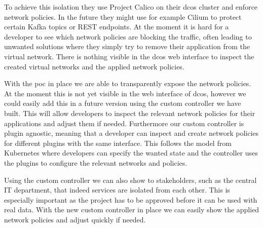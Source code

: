 To achieve this isolation they use Project Calico on their \gls{dcos} cluster and enforce network policies. In the future they might use for example Cilium to protect certain Kafka topics or REST endpoints. At the moment it is hard for a developer to see which network policies are blocking the traffic, often leading to unwanted solutions where they simply try to remove their application from the virtual network. There is nothing visible in the \gls{dcos} web interface to inspect the created virtual networks and the applied network policies.

With the \gls{poc} in place we are able to transparently expose the network policies. At the moment this is not yet visible in the web interface of \gls{dcos}, however we could easily add this in a future version using the custom controller we have built. This will allow developers to inspect the relevant network policies for their applications and adjust them if needed. Furthermore our custom controller is plugin agnostic, meaning that a developer can inspect and create network policies for different plugins with the same interface. This follows the model from Kubernetes where developers can specify the wanted state and the controller uses the plugins to configure the relevant networks and policies. 

Using the custom controller we can also show to stakeholders, such as the central IT department, that indeed services are isolated from each other. This is especially important as the project has to be approved before it can be used with real data. With the new custom controller in place we can easily show the applied network policies and adjust quickly if needed.
